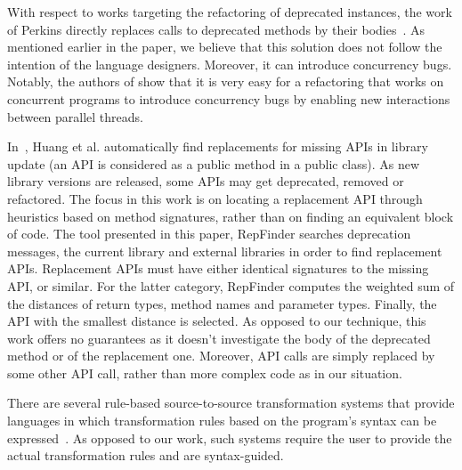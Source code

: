 \documentclass[sigconf,review,anonymous]{acmart}
\begin{document}
With respect to works targeting the refactoring of deprecated instances, the work of Perkins directly replaces calls to deprecated methods by their bodies~\cite{DBLP:conf/paste/Perkins05}.
As mentioned earlier in the paper, we believe that this solution does not follow the intention of the language designers. Moreover, it can
introduce concurrency bugs. Notably, the authors of \cite{10.1007/978-3-642-14107-2_11}
show that it is very easy for a refactoring that works on concurrent
programs to introduce concurrency bugs by enabling new interactions between
parallel threads. %


In~\cite{DBLP:conf/kbse/Huang0PW021}, Huang et al. automatically find replacements for missing APIs in library update (an API is considered as a public method in a public class). As new library versions are released, some APIs may get deprecated, removed or refactored.
The focus in this work is on locating a replacement API through heuristics based on method signatures, rather than on finding an equivalent block of code.
The tool presented in this paper, {\sc RepFinder} searches deprecation messages, the current library and external libraries in order to find replacement APIs. Replacement APIs must have either identical signatures to the missing API, or similar. For the latter category, {\sc RepFinder} computes the weighted sum of the distances of return types, method names and parameter types. Finally, the API with the smallest distance is selected. As opposed to our technique, this work offers no guarantees as it doesn't
investigate the body of the deprecated method or of the replacement one. Moreover, API calls
are simply replaced by some other API call, rather than more complex code as in our situation.







There are several rule-based source-to-source transformation systems that provide languages in which
transformation rules based on the program's syntax can be expressed~\cite{stratego,txl}. 
As opposed to our work, such systems require the user to provide the actual transformation rules and are syntax-guided.
\end{document}
